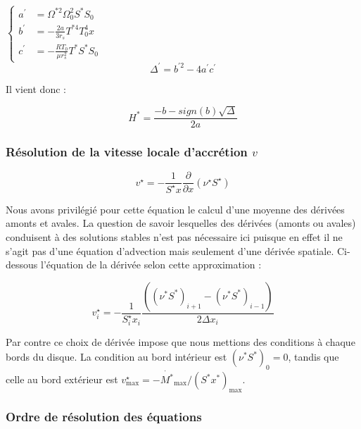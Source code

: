$\begin{cases}  
      a^{\prime} &= \Omega^{*2} \Omega_{0}^{2} S^{*} S_{0}\\
      b^{\prime} &= - \frac{2 a}{3 r_{s}} T^{*4} T_{0}^{4} x \\
      c^{\prime}&=-\frac{RT_{0}}{\mu r_{s}^{2}} T^{*} S^{*} S_{0}
     \end{cases}$ \\


\begin{equation}
	\Delta^{\prime} = b^{\prime 2} - 4a^{\prime}c^{\prime}
\end{equation} 

Il vient donc : 

\begin{equation}
	H^{*} = \frac{-b -sign(b) \sqrt{\Delta}}{2a}
\end{equation}


\subsubsection{Résolution de la vitesse locale d'accrétion $v$}
\begin{equation}
    v^\star = - \frac{1}{S^\star x} \frac{\partial}{\partial x} \left(\nu^\star S^\star\right)
\end{equation} 

Nous avons privilégié pour cette équation le calcul d'une moyenne des dérivées amonts et avales. La question de savoir lesquelles des dérivées (amonts ou avales) conduisent à  des solutions stables n'est pas nécessaire ici puisque en effet il ne s'agit pas d'une équation d'advection mais seulement d'une dérivée spatiale. Ci-dessous l'équation de la dérivée selon cette approximation : 

\begin{equation}
v^\star_{i} = - \frac{1}{S_{i}^\star x_{i}} \frac{( (\nu^{*}S^{*})_{i+1} - (\nu^{*}S^{*})_{i-1} )}{2 \Delta x_{i}}
\end{equation} 

Par contre ce choix de dérivée impose que nous mettions des conditions à  chaque bords du disque. La condition au bord intérieur est  $(\nu^{*}S^{*})_{0} = 0$, tandis que celle au bord extérieur est $v^\star_\textrm{max}   = - \dot{M^{*}}_\textrm{max} / (S^{*}x^{*})_\textrm{max}$.


\subsubsection{Ordre de résolution des équations}

